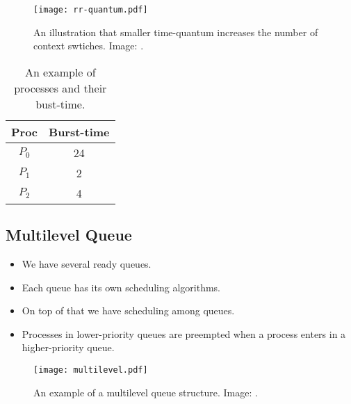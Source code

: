 \documentclass{beamer}
\begin{document}
\begin{frame}{\insertsubsectionhead}
  \begin{figure}
    \texttt{[image: rr-quantum.pdf]}
    \caption{An illustration that smaller time-quantum increases the number of 
      context swtiches.
      Image: \cite{Silberschatz2013osc}.}
  \end{figure}
\end{frame}

\begin{frame}{\insertsubsectionhead}
  \begin{table}
    \begin{tabular}{cc}
      \textbf{Proc} & \textbf{Burst-time} \\
      \toprule
      \(P_0\)   & 24 \\
      \(P_1\)   & 2 \\
      \(P_2\)   & 4 \\
      \bottomrule
    \end{tabular}
    \caption{An example of processes and their bust-time.}
  \end{table}
\end{frame}

\begin{frame}{\insertsubsectionhead}
\end{frame}

\subsection{Multilevel Queue}

\begin{frame}{\insertsubsectionhead}
  \begin{itemize}
    \item We have several ready queues.
    \item Each queue has its own scheduling algorithms.
    \item On top of that we have scheduling among queues.
    \item Processes in lower-priority queues are preempted when a process 
      enters in a higher-priority queue.
  \end{itemize}
\end{frame}

\begin{frame}{\insertsubsectionhead}
  \begin{figure}
    \texttt{[image: multilevel.pdf]}
    \caption{An example of a multilevel queue structure.
      Image: \cite{Silberschatz2013osc}.}
  \end{figure}
\end{frame}
\end{document}
